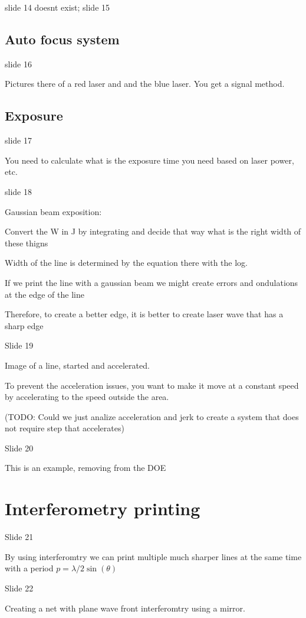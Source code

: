 \documentclass[../main/main.tex]{subfiles}
\begin{document}
slide 14 doesnt exist; slide 15

\subsection{Auto focus system}

slide 16

Pictures there of a red laser and and the blue laser. You get a signal method.

\subsection{Exposure}
slide 17

You need to calculate what is the exposure time you need based on laser power, etc.

slide 18

Gaussian beam exposition:

Convert the W in J by  integrating and decide that way what is the right width of these thigns

Width of the line is determined by the equation there with the log.

If we print the line with a gaussian beam we might create errors and ondulations at the edge of the line

Therefore, to create a better edge, it is better to create laser wave that has a sharp edge

Slide 19

Image of a line, started and accelerated.

To prevent the acceleration issues, you want to make it move at a constant speed by accelerating to the speed outside the area.

(TODO: Could we just analize acceleration and jerk to create a system that does not require step that accelerates)


Slide 20

This is an example, removing from the DOE


\section{Interferometry printing}

Slide 21

By using interferomtry we can print multiple much sharper lines at the same time with a period $p = \lambda/ 2 \sin (\theta)$

Slide 22

Creating a net with plane wave front interferomtry using a mirror.
\end{document}

